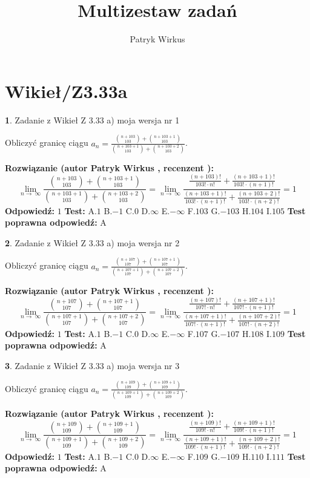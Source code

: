 \documentclass[12pt, a4paper]{article}
\title{Multizestaw zadań}
\author{Patryk Wirkus}
\date{}
\theoremstyle{definition} %
\newtheorem{zad}{}
\newcommand{\kategoria}[1]{\section{#1}}
\newcommand{\zadStart}[1]{\begin{zad}#1\newline}
\newcommand{\zadStop}{\end{zad}}
\newcommand{\rozwStart}[2]{\noindent \textbf{Rozwiązanie (autor #1 , recenzent #2): }\newline}
\newcommand{\rozwStop}{\newline}
\newcommand{\odpStart}{\noindent \textbf{Odpowiedź:}\newline}
\newcommand{\odpStop}{\newline}
\newcommand{\testStart}{\noindent \textbf{Test:}\newline}
\newcommand{\testStop}{\newline}
\newcommand{\kluczStart}{\noindent \textbf{Test poprawna odpowiedź:}\newline}
\newcommand{\kluczStop}{\newline}
\begin{document}
\maketitle

\kategoria{Wikieł/Z3.33a}


\zadStart{Zadanie z Wikieł Z 3.33 a) moja wersja nr 1}

Obliczyć granicę ciągu $a_{n}=\frac{{n+103\choose103}+{n+103+1\choose103}}{{n+103+1\choose103}+{n+103+2\choose103}}$.
\zadStop
\rozwStart{Patryk Wirkus}{}
$$\lim\limits_{n\to\ \infty}\frac{{n+103\choose103}+{n+103+1\choose103}}{{n+103+1\choose103}+{n+103+2\choose103}} = \lim\limits_{n\to\ \infty}\frac{\frac{(n+103)!}{103! \cdot n!}+\frac{(n+103+1)!}{103! \cdot (n+1)!}}{\frac{(n+103+1)!}{103! \cdot (n+1)!}+\frac{(n+103+2)!}{103! \cdot (n+2)!}} = 1$$
\rozwStop
\odpStart
$1$
\odpStop
\testStart
A.$1$ B.$-1$ C.$0$ D.$\infty$ E.$-\infty$
F.$103$ G.$-103$
H.$104$
I.$105$
\testStop
\kluczStart
A
\kluczStop



\zadStart{Zadanie z Wikieł Z 3.33 a) moja wersja nr 2}

Obliczyć granicę ciągu $a_{n}=\frac{{n+107\choose107}+{n+107+1\choose107}}{{n+107+1\choose107}+{n+107+2\choose107}}$.
\zadStop
\rozwStart{Patryk Wirkus}{}
$$\lim\limits_{n\to\ \infty}\frac{{n+107\choose107}+{n+107+1\choose107}}{{n+107+1\choose107}+{n+107+2\choose107}} = \lim\limits_{n\to\ \infty}\frac{\frac{(n+107)!}{107! \cdot n!}+\frac{(n+107+1)!}{107! \cdot (n+1)!}}{\frac{(n+107+1)!}{107! \cdot (n+1)!}+\frac{(n+107+2)!}{107! \cdot (n+2)!}} = 1$$
\rozwStop
\odpStart
$1$
\odpStop
\testStart
A.$1$ B.$-1$ C.$0$ D.$\infty$ E.$-\infty$
F.$107$ G.$-107$
H.$108$
I.$109$
\testStop
\kluczStart
A
\kluczStop



\zadStart{Zadanie z Wikieł Z 3.33 a) moja wersja nr 3}

Obliczyć granicę ciągu $a_{n}=\frac{{n+109\choose109}+{n+109+1\choose109}}{{n+109+1\choose109}+{n+109+2\choose109}}$.
\zadStop
\rozwStart{Patryk Wirkus}{}
$$\lim\limits_{n\to\ \infty}\frac{{n+109\choose109}+{n+109+1\choose109}}{{n+109+1\choose109}+{n+109+2\choose109}} = \lim\limits_{n\to\ \infty}\frac{\frac{(n+109)!}{109! \cdot n!}+\frac{(n+109+1)!}{109! \cdot (n+1)!}}{\frac{(n+109+1)!}{109! \cdot (n+1)!}+\frac{(n+109+2)!}{109! \cdot (n+2)!}} = 1$$
\rozwStop
\odpStart
$1$
\odpStop
\testStart
A.$1$ B.$-1$ C.$0$ D.$\infty$ E.$-\infty$
F.$109$ G.$-109$
H.$110$
I.$111$
\testStop
\kluczStart
A
\kluczStop
\end{document}
